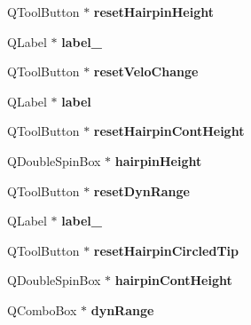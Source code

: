 \begin{DoxyCompactItemize}
Q\+Tool\+Button $\ast$ {\bfseries reset\+Hairpin\+Height}
\item 
\mbox{\label{class_ui___inspector_hairpin_a5276b5da34e81b5ee61db464f4295aa9}} 
Q\+Label $\ast$ {\bfseries label\+\_}
\item 
\mbox{\label{class_ui___inspector_hairpin_ac61113de7cfd7f71bf727039e6fe5ad1}} 
Q\+Tool\+Button $\ast$ {\bfseries reset\+Velo\+Change}
\item 
\mbox{\label{class_ui___inspector_hairpin_ac910e68fecbbefcc0a5a7e0320e5b9af}} 
Q\+Label $\ast$ {\bfseries label}
\item 
\mbox{\label{class_ui___inspector_hairpin_a8ee433565be006a01e04dab99cf839c0}} 
Q\+Tool\+Button $\ast$ {\bfseries reset\+Hairpin\+Cont\+Height}
\item 
\mbox{\label{class_ui___inspector_hairpin_ac9e6d88ebd9723ba96640d276d2d9482}} 
Q\+Double\+Spin\+Box $\ast$ {\bfseries hairpin\+Height}
\item 
\mbox{\label{class_ui___inspector_hairpin_ae3c248cdda199d77043e6d91f6d3f15b}} 
Q\+Tool\+Button $\ast$ {\bfseries reset\+Dyn\+Range}
\item 
\mbox{\label{class_ui___inspector_hairpin_a1cc89965e6e89f2ee90f3a76c5b3a239}} 
Q\+Label $\ast$ {\bfseries label\+\_}
\item 
\mbox{\label{class_ui___inspector_hairpin_ad4c3d076dc63c5162347acd660855244}} 
Q\+Tool\+Button $\ast$ {\bfseries reset\+Hairpin\+Circled\+Tip}
\item 
\mbox{\label{class_ui___inspector_hairpin_abb5c3f55717d6125038d6efda97d75bf}} 
Q\+Double\+Spin\+Box $\ast$ {\bfseries hairpin\+Cont\+Height}
\item 
\mbox{\label{class_ui___inspector_hairpin_ab601621fe37edf162b982dd91a5ff252}} 
Q\+Combo\+Box $\ast$ {\bfseries dyn\+Range}
\item 

\end{DoxyCompactItemize}
